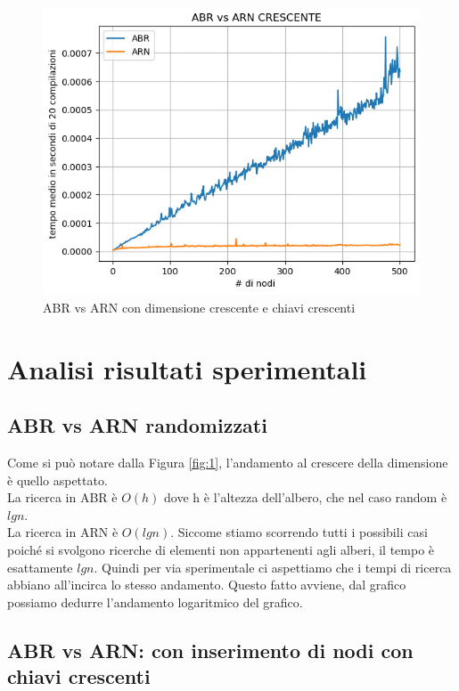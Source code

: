 \documentclass[12pt]{article}
\begin{document}
\begin{figure}[H]
\includegraphics[width = 12cm]{ABR_vs_ARN_CRESCENTE}
\centering
\caption{ABR vs ARN con dimensione crescente e chiavi crescenti}
\label{fig:2}
\end{figure}  

\section{Analisi risultati sperimentali}

\subsection{ABR vs ARN randomizzati}

Come si può notare dalla Figura \ref{fig:1}, l'andamento al crescere della dimensione è quello aspettato.\\
La ricerca in ABR è $O(h)$ dove h è l'altezza dell'albero, che nel caso random è $lg n$.\\
La ricerca in ARN è $O(lg n)$.
Siccome stiamo scorrendo tutti i possibili casi poiché si svolgono ricerche di elementi non appartenenti agli alberi, il tempo è esattamente $lg n$.
Quindi per via sperimentale ci aspettiamo che i tempi di ricerca abbiano all'incirca lo stesso andamento.
Questo fatto avviene, dal grafico possiamo dedurre l'andamento logaritmico del grafico.


\subsection{ABR vs ARN: con inserimento di nodi con chiavi crescenti}
\end{document}
